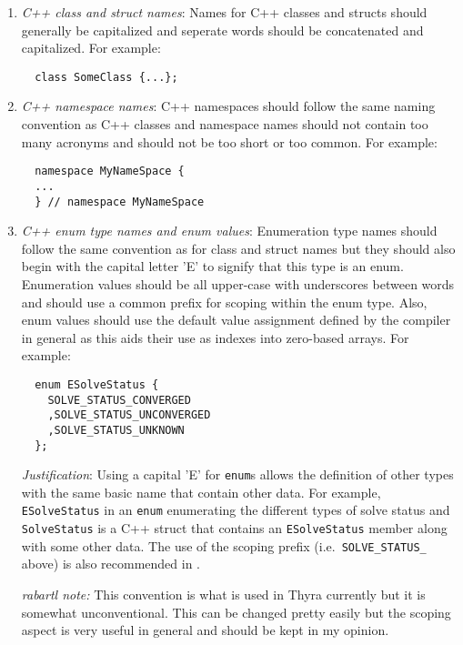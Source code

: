 \begin{enumerate}

{}\item\textit{C++ class and struct names}: Names for C++ classes and structs
should generally be capitalized and seperate words should be concatenated and
capitalized.  For example:

{\small\begin{verbatim}
  class SomeClass {...};
\end{verbatim}}

{}\item\textit{C++ namespace names}: C++ namespaces should follow the same
naming convention as C++ classes and namespace names should not contain too
many acronyms and should not be too short or too common.  For example:

{\small\begin{verbatim}
  namespace MyNameSpace {
  ...
  } // namespace MyNameSpace 
\end{verbatim}}

{}\item\textit{C++ enum type names and enum values}: Enumeration type names
should follow the same convention as for class and struct names but they
should also begin with the capital letter 'E' to signify that this type is an
enum.  Enumeration values should be all upper-case with underscores between
words and should use a common prefix for scoping within the enum type.  Also,
enum values should use the default value assignment defined by the compiler in
general as this aids their use as indexes into zero-based arrays.  For
example:

{\small\begin{verbatim}
  enum ESolveStatus {
    SOLVE_STATUS_CONVERGED
    ,SOLVE_STATUS_UNCONVERGED
    ,SOLVE_STATUS_UNKNOWN
  };
\end{verbatim}}

{}\textit{Justification}: Using a capital 'E' for {}\texttt{enum}s allows the
definition of other types with the same basic name that contain other data.
For example, {}\texttt{ESolveStatus} in an {}\texttt{enum} enumerating the
different types of solve status and {}\texttt{SolveStatus} is a C++ struct
that contains an {}\texttt{ESolveStatus} member along with some other data.
The use of the scoping prefix (i.e.\ {}\texttt{SOLVE\-\_STATUS\_} above) is
also recommended in {}\cite[Section 11.4]{CodeComplete2nd04}.

{}\textit{rabartl note:} This convention is what is used in Thyra currently
but it is somewhat unconventional.  This can be changed pretty easily but the
scoping aspect is very useful in general and should be kept in my opinion.


\end{enumerate}
